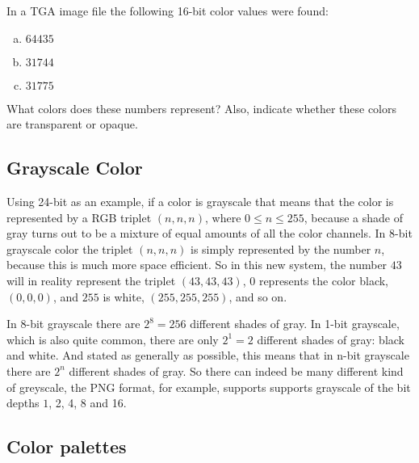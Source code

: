 \begin{Exercise}[label={tga-16-bit}]

  In a TGA image file the following 16-bit color values were found:

  \begin{enumerate}[(a)]
  \item $64435$
  \item $31744$
  \item $31775$
  \end{enumerate}

  What colors does these numbers represent? Also, indicate whether
  these colors are transparent or opaque.

\end{Exercise}

\subsection{Grayscale Color}
\label{sec:grayscale-color}

\newcommand{\selfrgbtrip}[3]{\mbox{\textcolor[RGB]{#1,#2,#3}{(#1,#2,#3)}}}
\newcommand{\selfrgbtripgray}[1]{\selfrgbtrip{#1}{#1}{#1}}

Using 24-bit as an example, if a color is grayscale that means that
the color is represented by a RGB triplet $(n,n,n)$, where $0 \le n
\le 255$, because a shade of gray turns out to be a mixture of equal
amounts of all the color channels. In 8-bit grayscale color the
triplet $(n,n,n)$ is simply represented by the number $n$, because
this is much more space efficient. So in this new system, the number
$43$ will in reality represent the triplet $(43,43,43)$, $0$
represents the color black, $(0,0,0)$, and $255$ is white,
$(255,255,255)$, and so on.

In 8-bit grayscale there are $2^8 = 256$ different shades of gray. In
1-bit grayscale, which is also quite common, there are only $2^1 = 2$
different shades of gray: black and white. And stated as generally as
possible, this means that in n-bit grayscale there are $2^n$ different
shades of gray. So there can indeed be many different kind of
greyscale, the PNG format, for example, supports supports grayscale of
the bit depths $1$, 2, 4, 8 and
16\cite{boutel:_png_portab_networ_graph_specif_version12}.

\subsection{Color palettes}

